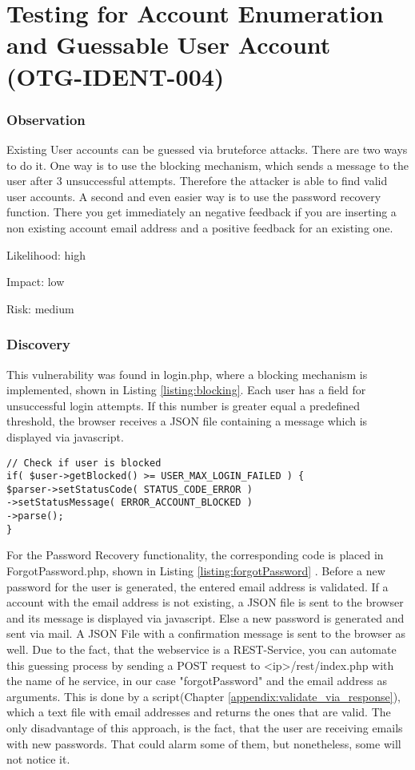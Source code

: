 \chapter{Testing for Account Enumeration and Guessable User Account (OTG-IDENT-004)}
\subsection{Observation}
Existing User accounts can be guessed via bruteforce attacks. There are two ways to do it. One way is to use the blocking mechanism, which sends a message to the user after 3 unsuccessful attempts. Therefore the attacker is able to find valid user accounts.
A second and even easier way is to use the  password recovery function. There you get immediately an negative feedback if you are inserting a non existing account email address and a positive feedback for an existing  one.


Likelihood: high \newline

Impact: low\newline

Risk: medium\newline

\subsection{Discovery}
This vulnerability was found in login.php, where a blocking mechanism is implemented, shown in Listing \ref{listing:blocking}.  Each user has a field for unsuccessful login attempts. If this number is greater equal a predefined threshold, the browser  receives a JSON file containing a message which is displayed via javascript.
\begin{lstlisting}[caption= Blocking Mechanism in login.php line 54-59 ,label=listing:blocking]
// Check if user is blocked
if( $user->getBlocked() >= USER_MAX_LOGIN_FAILED ) {
$parser->setStatusCode( STATUS_CODE_ERROR )
->setStatusMessage( ERROR_ACCOUNT_BLOCKED )
->parse();
}
\end{lstlisting}

For the Password Recovery  functionality, the corresponding code is placed in ForgotPassword.php, shown in Listing \ref{listing:forgotPassword} . Before a new password for the user is generated, the entered email address is validated.  If a account with the email address is not existing, a JSON file is sent to the browser and its message is displayed via javascript. Else a new password is generated and sent via mail. A JSON File with a confirmation message is sent to the browser as well. Due to the fact, that the webservice is a REST-Service, you can automate this guessing process by sending a POST request to <ip>/rest/index.php with the name of he service, in our case "forgotPassword" and the email address as arguments. This is done by a script(Chapter \ref{appendix:validate_via_response}), which a text file with email addresses and returns the ones that are valid. The only disadvantage of this approach, is the fact, that the user are receiving emails with new passwords. That could alarm some of them, but nonetheless, some will not notice it.

